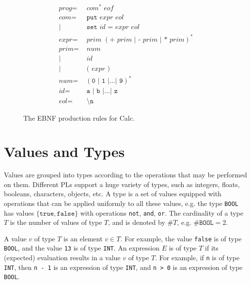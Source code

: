 \documentclass[a4paper, openany]{memoir}
\begin{document}
\begin{figure}[H]
    \begin{align*}
        \textit{prog} =& \textit{ com}^{\texttt{*}}  \textit{ eof} \\
        \textit{com} =& \texttt{ put} \textit{ expr eol} \\
        |\hspace{2pt} & \texttt{ set} \textit{ id } \texttt{=} \textit{ expr eol} \\
        \textit{expr} =& \textit{  prim } (\texttt{+} \textit{ prim }|\texttt{ -} \textit{ prim }|\texttt{ *} \textit{ prim})^{\texttt{*}} \\
        \textit{prim} =& \textit{ num} \\
        |\hspace{2pt} & \textit{ id} \\
        |\hspace{2pt} & \texttt{ (} \textit{ expr } \texttt{)} \\
        \textit{num} =& \ (\texttt{0 } | \texttt{ 1 } | \dots | \texttt{ 9})^{\texttt{*}} \\
        \textit{id} =& \texttt{ a } | \texttt{ b } | \dots | \texttt{ z} \\
        \textit{eol} =& \texttt{ \textbackslash n}
    \end{align*}
    \caption{The EBNF production rules for Calc.}
\end{figure}

\newpage

\section{Values and Types}
Values are grouped into types according to the operations that may be performed on them. Different PLs support a huge variety of types, such as integers, floats, booleans, characters, objects, etc. A type is a set of values equipped with operations that can be applied uniformly to all these values, e.g. the type \texttt{BOOL} has values $\{\texttt{true}, \texttt{false}\}$ with operations \texttt{not}, \texttt{and}, \texttt{or}. The cardinality of a type $T$ is the number of values of type $T$, and is denoted by $\#T$, e.g. $\#\texttt{BOOL} = 2$.

A value $v$ of type $T$ is an element $v \in T$. For example, the value \texttt{false} is of type \texttt{BOOL}, and the value \texttt{13} is of type \texttt{INT}. An expression $E$ is of type $T$ if its (expected) evaluation results in a value $v$ of type $T$. For example, if \texttt{n} is of type \texttt{INT}, then \texttt{n - 1} is an expression of type \texttt{INT}, and \texttt{n > 0} is an expression of type \texttt{BOOL}.
\end{document}
